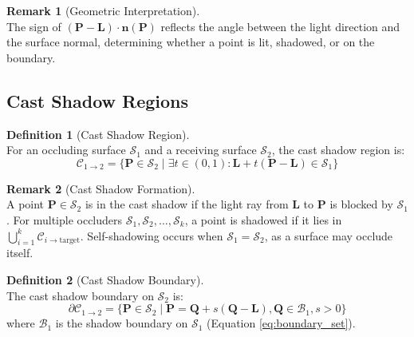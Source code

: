 \documentclass[12pt]{article}
\newcommand{\vect}[1]{\bm{#1}}
\theoremstyle{definition}
\newtheorem{definition}{Definition}[subsection]
\newtheorem{remark}{Remark}[subsection]
\begin{document}
\begin{remark}[Geometric Interpretation] \label{rmk:illum_sign} ~\\
The sign of $(\vect{P} - \vect{L}) \cdot \vect{n}(\vect{P})$ reflects the angle between the light direction and the surface normal, determining whether a point is lit, shadowed, or on the boundary.
\end{remark}

\subsection{Cast Shadow Regions} \label{sec:cast_shadow}

\begin{definition}[Cast Shadow Region] \label{def:cast_shadow} ~\\
For an occluding surface $\mathcal{S}_1$ and a receiving surface $\mathcal{S}_2$, the cast shadow region is:
\begin{equation}
\boxed{\mathcal{C}_{1 \to 2} = \{\vect{P} \in \mathcal{S}_2 \mid \exists t \in (0,1): \vect{L} + t(\vect{P} - \vect{L}) \in \mathcal{S}_1\}} \label{eq:cast_shadow}
\end{equation}
\end{definition}

\begin{remark}[Cast Shadow Formation] \label{rmk:cast_shadow_formation} ~\\
A point $\vect{P} \in \mathcal{S}_2$ is in the cast shadow if the light ray from $\vect{L}$ to $\vect{P}$ is blocked by $\mathcal{S}_1$. For multiple occluders $\mathcal{S}_1, \mathcal{S}_2, \ldots, \mathcal{S}_k$, a point is shadowed if it lies in $\bigcup_{i=1}^k \mathcal{C}_{i \to \text{target}}$. Self-shadowing occurs when $\mathcal{S}_1 = \mathcal{S}_2$, as a surface may occlude itself.
\end{remark}

\begin{definition}[Cast Shadow Boundary] \label{def:cast_boundary} ~\\
The cast shadow boundary on $\mathcal{S}_2$ is:
\begin{equation}
\boxed{\partial\mathcal{C}_{1 \to 2} = \{\vect{P} \in \mathcal{S}_2 \mid \vect{P} = \vect{Q} + s(\vect{Q} - \vect{L}), \vect{Q} \in \mathcal{B}_1, s > 0\}} \label{eq:cast_boundary}
\end{equation}
where $\mathcal{B}_1$ is the shadow boundary on $\mathcal{S}_1$ (Equation \eqref{eq:boundary_set}).
\end{definition}
\end{document}
